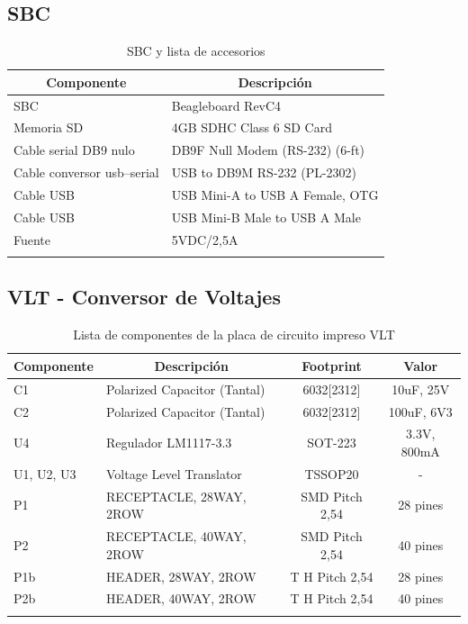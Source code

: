 \subsection{SBC}
\begin{longtable}{|l|l|}
\hline
\multicolumn{1}{|c|}{\textbf{Componente}} & \multicolumn{1}{c|}{\textbf{Descripción}} \\ \hline
SBC & Beagleboard  RevC4 \\ \hline
Memoria SD & 4GB SDHC Class 6 SD Card \\ \hline
Cable serial DB9 nulo & DB9F Null Modem (RS-232) (6-ft) \\ \hline
Cable conversor usb–serial & USB to DB9M RS-232 (PL-2302) \\ \hline
Cable USB & USB Mini-A to USB A Female, OTG \\ \hline
Cable USB & USB Mini-B Male to USB A Male \\ \hline
Fuente  & 5VDC/2,5A \\ \hline
\caption{SBC y lista de accesorios}
\label{}
\end{longtable}

\newpage
\subsection{VLT - Conversor de Voltajes}
\begin{longtable}{|l|l|c|c|}
\hline
\multicolumn{1}{|c|}{\textbf{Componente}} & \multicolumn{1}{c|}{\textbf{Descripción}} & \textbf{ Footprint} & \textbf{Valor} \\ \hline
C1 & Polarized Capacitor (Tantal) & 6032[2312] & 10uF, 25V \\ \hline
C2 & Polarized Capacitor (Tantal) & 6032[2312] & 100uF, 6V3 \\ \hline
U4 & Regulador LM1117-3.3 & SOT-223 & 3.3V, 800mA \\ \hline
U1, U2, U3 & Voltage Level Translator & TSSOP20 & - \\ \hline
P1 & RECEPTACLE, 28WAY, 2ROW & SMD  Pitch 2,54 & 28 pines \\ \hline
P2 & RECEPTACLE, 40WAY, 2ROW & SMD  Pitch 2,54 & 40 pines \\ \hline
P1b & HEADER, 28WAY, 2ROW & T H Pitch 2,54 & 28 pines \\ \hline
P2b & HEADER, 40WAY, 2ROW & T H Pitch 2,54 & 40 pines \\ \hline
\caption{Lista de componentes de la placa de circuito impreso VLT}
\label{}
\end{longtable}

